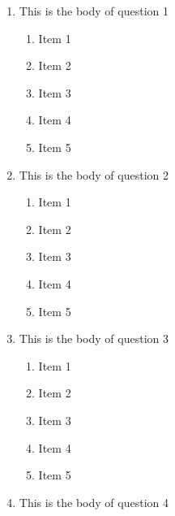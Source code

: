 \documentclass[amsfonts,bezier,leqno,fleqn,12pt,a4paper]{article}
\begin{document}
\newpage


\renewcommand{\thepage}{\noindent Term Term 212, MATH101, Final Exam \hfill Page {\bf \arabic{page} of 5 } \hfill {\bf \fbox{ MASTER }}}
\setcounter{page}{1}


\begin{large}
\begin{enumerate}

\item This is the body of question 1
\vspace {0.3in}
\setcounter{equation}{0}

\begin{enumerate}
\item Item 1
\item Item 2
\item Item 3
\item Item 4
\item Item 5

\end{enumerate}

\vspace {3.5cm}


\item This is the body of question 2
\vspace {0.3in}
\setcounter{equation}{0}

\begin{enumerate}
\item Item 1
\item Item 2
\item Item 3
\item Item 4
\item Item 5

\end{enumerate}
\newpage


\item This is the body of question 3
\vspace {0.3in}
\setcounter{equation}{0}

\begin{enumerate}
\item Item 1
\item Item 2
\item Item 3
\item Item 4
\item Item 5

\end{enumerate}

\vspace {3.5cm}


\item This is the body of question 4
\vspace {0.3in}
\setcounter{equation}{0}


\end{enumerate}
\end{large}
\end{document}
